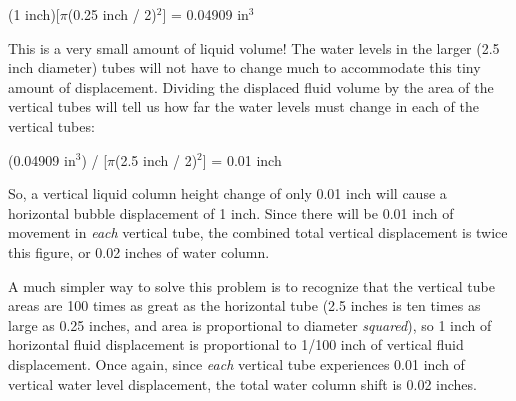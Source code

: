 \vskip 10pt

(1 inch)[$\pi$(0.25 inch / 2)$^{2}$] = 0.04909 in$^{3}$

\vskip 10pt

This is a very small amount of liquid volume!  The water levels in the larger (2.5 inch diameter) tubes will not have to change much to accommodate this tiny amount of displacement.  Dividing the displaced fluid volume by the area of the vertical tubes will tell us how far the water levels must change in each of the vertical tubes:

\vskip 10pt

(0.04909 in$^{3}$) / [$\pi$(2.5 inch / 2)$^{2}$] = 0.01 inch

\vskip 10pt

So, a vertical liquid column height change of only 0.01 inch will cause a horizontal bubble displacement of 1 inch.  Since there will be 0.01 inch of movement in {\it each} vertical tube, the combined total vertical displacement is twice this figure, or 0.02 inches of water column.

A much simpler way to solve this problem is to recognize that the vertical tube areas are 100 times as great as the horizontal tube (2.5 inches is ten times as large as 0.25 inches, and area is proportional to diameter {\it squared}), so 1 inch of horizontal fluid displacement is proportional to 1/100 inch of vertical fluid displacement.  Once again, since {\it each} vertical tube experiences 0.01 inch of vertical water level displacement, the total water column shift is 0.02 inches.












